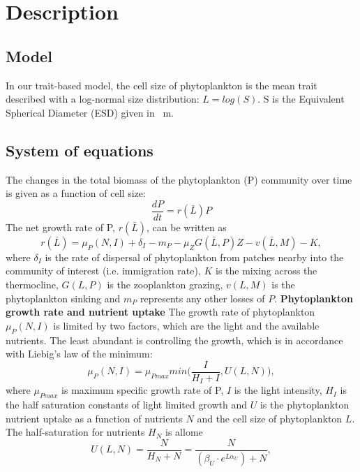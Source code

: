 \section{Description}
\subsection{Model}
In our trait-based model, the cell size of phytoplankton is the mean trait described with a log-normal size distribution: $L=log(S)$. S is the Equivalent Spherical Diameter (ESD) given in \si{\mu m}. 
\subsection{System of equations}
The changes in the total biomass of the phytoplankton (P) community over time is given as a function of cell size:
\begin{equation}
    \label{eq:phytoplanktonbiomass}
    \frac{dP}{dt} = r(\bar{L})P
\end{equation}
The net growth rate of P, $r(\bar{L})$, can be written as
\begin{equation}
    \label{eq:netgrowthrateP}
    r(\bar{L})=\mu_P(N,I)+\delta_I-m_P-\mu_ZG(\bar{L},P)Z-v(\bar{L},M)-K,
\end{equation}
where $\delta_I$ is the rate of dispersal of phytoplankton from patches nearby into the community of interest (i.e. immigration rate), $K$ is the mixing across the thermocline, $G(L,P)$ is the zooplankton grazing, $v(L,M)$ is the phytoplankton sinking and $m_P$ represents any other losses of $P$.
\newline
\newline
\textbf{Phytoplankton growth rate and nutrient uptake}
\newline
The growth rate of phytoplankton $\mu_P(N,I)$ is limited by two factors, which are the light and the available nutrients. The least abundant is controlling the growth, which is in accordance with Liebig's law of the minimum:
\begin{equation}
    \label{eq:growthrate}
    \mu_P(N,I) = \mu_{Pmax}min\bigg(\frac{I}{H_I+I},U(L,N)\bigg),
\end{equation}
where $\mu_{Pmax}$ is maximum specific growth rate of P, $I$ is the light intensity, $H_{I}$ is the half saturation constants of light limited growth and $U$ is the phytoplankton nutrient uptake as a function of nutrients $N$ and the cell size of phytoplankton $L$. The half-saturation for nutrients $H_N$ is allome
\begin{equation}
    \label{eq:nutrientuptake}
    U(L,N) = \frac{N}{H_N+N}=\frac{N}{(\beta_U\cdot e^{L\alpha_U})+N},
\end{equation}
